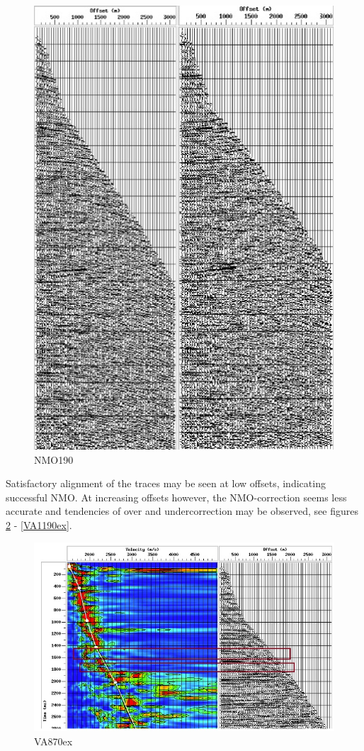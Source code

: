 \documentclass[10pt,a4paper]{article}
\begin{document}
\begin{figure}[H]
\includegraphics[width=\textwidth]{beforeAfter_NMOcorr_1190.jpg}
\caption{NMO190}
\label{NMO1190}
\end{figure}

\noindent Satisfactory alignment of the traces may be seen at low offsets, indicating successful NMO. At increasing offsets however, the NMO-correction seems less accurate and tendencies of over and undercorrection may be observed, see figures \ref{VA870ex} - \ref{VA1190ex}.

\begin{figure}[H]
\includegraphics[width=\textwidth]{Velo_anal_example_870.jpg}
\caption{VA870ex}
\label{VA870ex}
\end{figure}
\end{document}
